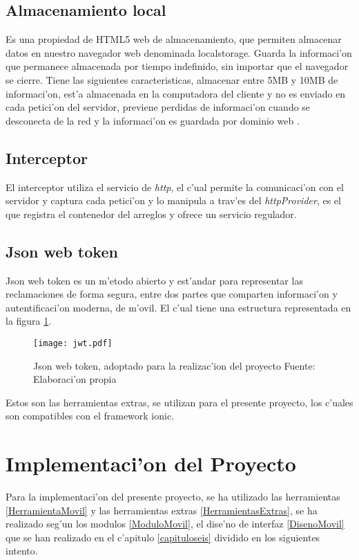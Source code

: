 \subsection{Almacenamiento local}
Es una propiedad de HTML5 web de almacenamiento, que permiten almacenar datos en nuestro navegador web denominada localstorage.
Guarda la informaci'on que permanece almacenada por tiempo indefinido, sin importar que el navegador se cierre. Tiene las siguientes caracteristicas, almacenar entre 5MB y 10MB de informaci'on, est'a almacenada en la computadora del cliente y no es enviado en cada petici'on del servidor, previene perdidas de informaci'on cuando se desconecta de la red y la informaci'on es guardada por dominio web \cite{Cardenas2015}.
\subsection{Interceptor}                                                                                                                                                                                                                                              
El interceptor utiliza el servicio de \textit{http}, el c'ual permite la comunicaci'on con el servidor y captura cada petici'on y lo manipula a trav'es del \textit{httpProvider}, es el que registra el contenedor del arreglos y ofrece un servicio regulador.
\subsection{Json web token}
Json web token es un m'etodo abierto y est'andar para representar las  reclamaciones de forma segura, entre dos partes que comparten informaci'on y autentificaci'on moderna, de m'ovil. El c'ual tiene una estructura representada en la figura \ref{fig:jwt}.
\begin{figure}[H]
\centering
\texttt{[image: jwt.pdf]}
\captionsetup{justification=centering,margin=2cm}
\caption{Json web token, adoptado para la realizac'ion del proyecto Fuente: Elaboraci'on propia}
\label{fig:jwt}
\end{figure}

Estos son las herramientas extras, se utilizan para el presente proyecto, los c'uales son compatibles con el framework ionic.

\section{Implementaci'on del Proyecto}
Para la implementaci'on del presente proyecto, se ha utilizado las herramientas \ref{HerramientaMovil} y las herramientas extras \ref{HerramientasExtras}, se ha realizado seg'un los modulos \ref{ModuloMovil}, el dise'no de interfaz \ref{DisenoMovil} que se han realizado en el c'apitulo \ref{capituloseis}
dividido en los siguientes intento.

